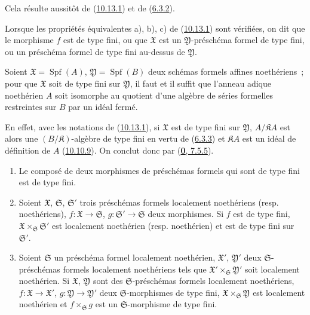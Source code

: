 Cela résulte aussitôt de (\hyperref[I.10.13.1-fr]{10.13.1}) et de
(\hyperref[I.6.3.2-fr]{6.3.2}).

\begin{definition}[10.13.3]
\label{I.10.13.3-fr}
Lorsque les propriétés équivalentes \textup{a), b), c)} de
\textup{(\hyperref[I.10.13.1-fr]{10.13.1})} sont vérifiées, on dit que le morphisme
$f$ est de type fini, ou que $\mathfrak{X}$ est un
$\mathfrak{Y}$-préschéma formel de type fini, ou un
préschéma formel de type fini au-dessus de $\mathfrak{Y}$.
\end{definition}

\begin{corollary}[10.13.4]
\label{I.10.13.4-fr}
Soient $\mathfrak{X}=\operatorname{Spf}(A)$,
$\mathfrak{Y}=\operatorname{Spf}(B)$ deux schémas formels affines
noethériens~; pour que $\mathfrak{X}$ soit de type fini sur
$\mathfrak{Y}$, il faut et il suffit que l'anneau adique noethérien $A$ soit
isomorphe au quotient d'une algèbre de séries formelles restreintes sur $B$
par un idéal fermé.
\end{corollary}

En effet, avec les notations de (\hyperref[I.10.13.1-fr]{10.13.1}), si
$\mathfrak{X}$ est de type fini sur $\mathfrak{Y}$,
$A/\mathfrak{K}A$ est alors une $(B/\mathfrak{K})$-algèbre de type fini en
vertu de (\hyperref[I.6.3.3-fr]{6.3.3}) et $\mathfrak{K}A$ est un idéal de
définition de $A$ (\hyperref[I.10.10.9-fr]{10.10.9}). On conclut donc par
(\hyperref[0.7.5.5-fr]{\textbf{0}, 7.5.5}).

\begin{proposition}[10.13.5]
\label{I.10.13.5-fr}
\medskip\noindent
\begin{enumerate}
  \item[\rm{(i)}] Le composé de deux morphismes de préschémas formels qui
    sont de type fini est de type fini.


  \item[\rm{(ii)}] Soient $\mathfrak{X}$, $\mathfrak{S}$,
    $\mathfrak{S}'$ trois préschémas formels localement noethériens \textup{(resp.}
    noethériens\textup{)}, $f:\mathfrak{X}\to\mathfrak{S}$,
    $g:\mathfrak{S}'\to\mathfrak{S}$ deux morphismes. Si $f$ est de type
    fini, $\mathfrak{X}\times_{\mathfrak{S}}\mathfrak{S}'$ est localement
    noethérien \textup{(resp.} noethérien\textup{)} et est de type fini sur $\mathfrak{S}'$.
  \item[\rm{(iii)}] Soient $\mathfrak{S}$ un préschéma formel localement
    noethérien, $\mathfrak{X}'$, $\mathfrak{Y}'$ deux
    $\mathfrak{S}$-préschémas formels localement noethériens tels que
    $\mathfrak{X}'\times_{\mathfrak{S}}\mathfrak{Y}'$ soit localement
    noethérien. Si $\mathfrak{X}$, $\mathfrak{Y}$ sont des
    $\mathfrak{S}$-préschémas formels localement noethériens,
    $f:\mathfrak{X}\to\mathfrak{X}'$,
    $g:\mathfrak{Y}\to\mathfrak{Y}'$ deux $\mathfrak{S}$-morphismes de
    type fini, $\mathfrak{X}\times_{\mathfrak{S}}\mathfrak{Y}$ est
    localement noethérien et $f\times_{\mathfrak{S}}g$ est un
    $\mathfrak{S}$-morphisme de type fini.
\end{enumerate}
\end{proposition}

